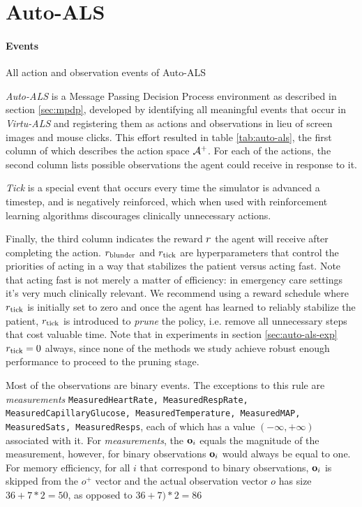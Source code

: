 \newpage
\section{Auto-ALS}

\paragraph{Events}

\begin{table}

\caption{All action and observation events of Auto-ALS}
\label{tab:auto-als}
\end{table}

\emph{Auto-ALS} is a Message Passing Decision Process environment as described in section \ref{sec:mpdp}, developed by identifying all meaningful events that occur in \emph{Virtu-ALS} and registering them as actions and observations in lieu of screen images and mouse clicks.
This effort resulted in table \ref{tab:auto-als}, the first column of which describes the action space $\mathcal{A}^{+}$.
For each of the actions, the second column lists possible observations the agent could receive in response to it.

\emph{Tick} is a special event that occurs every time the simulator is advanced a timestep, and is negatively reinforced, which when used with reinforcement learning algorithms discourages clinically unnecessary actions.

Finally, the third column indicates the reward $r$ the agent will receive after completing the action.
$r_\text{blunder}$ and $r_\text{tick}$ are hyperparameters that control the priorities of acting in a way that stabilizes the patient versus acting fast.
Note that acting fast is not merely a matter of efficiency: in emergency care settings it's very much clinically relevant.
We recommend using a reward schedule where $r_\text{tick}$ is initially set to zero and once the agent has learned to reliably stabilize the patient, $r_\text{tick}$ is introduced to \emph{prune} the policy, i.e. remove all unnecessary steps that cost valuable time.
Note that in experiments in section \ref{sec:auto-als-exp} $r_\text{tick}=0$ always, since none of the methods we study achieve robust enough performance to proceed to the pruning stage.

Most of the observations are binary events.
The exceptions to this rule are \emph{measurements} \texttt{MeasuredHeartRate, MeasuredRespRate, MeasuredCapillaryGlucose, MeasuredTemperature, MeasuredMAP, MeasuredSats, MeasuredResps}, each of which has a value $(-\infty, +\infty)$ associated with it.
For \emph{measurements}, the $\mathbf{o}_i$ equals the magnitude of the measurement, however, for binary observations $\mathbf{o}_i$ would always be equal to one.
For memory efficiency, for all $i$ that correspond to binary observations, $\mathbf{o}_i$ is skipped from the $o^{+} $ vector and the actual observation vector $o$ has size $36+7*2=50$, as opposed to $36+7)*2=86$

